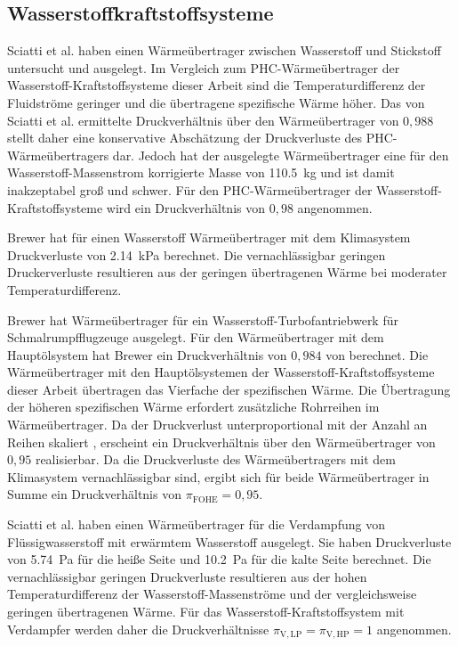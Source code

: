 \subsection{Wasserstoffkraftstoffsysteme}

Sciatti et al. \cite{Sciatti.2025} haben einen Wärmeübertrager zwischen Wasserstoff und Stickstoff untersucht und ausgelegt. Im Vergleich zum PHC-Wärmeübertrager der Wasserstoff-Kraftstoffsysteme dieser Arbeit sind die Temperaturdifferenz der Fluidströme geringer und die übertragene spezifische Wärme höher. Das von Sciatti et al. ermittelte Druckverhältnis über den Wärmeübertrager von $0,988$ stellt daher eine konservative Abschätzung der Druckverluste des PHC-Wärmeübertragers dar. Jedoch hat der ausgelegte Wärmeübertrager eine für den Wasserstoff-Massenstrom korrigierte Masse von \SI{110.5}{\kg} und ist damit inakzeptabel groß und schwer. Für den PHC-Wärmeübertrager der Wasserstoff-Kraftstoffsysteme wird ein Druckverhältnis von $0,98$ angenommen.

Brewer \cite{Brewer.1991} hat für einen Wasserstoff Wärmeübertrager mit dem Klimasystem Druckverluste von \SI{2.14}{\kilo\Pa} berechnet. Die vernachlässigbar geringen Druckerverluste resultieren aus der geringen übertragenen Wärme bei moderater Temperaturdifferenz.

Brewer \cite{Brewer.1991} hat Wärmeübertrager für ein Wasserstoff-Turbofantriebwerk für Schmalrumpfflugzeuge ausgelegt. Für den Wärmeübertrager mit dem Hauptölsystem hat Brewer ein Druckverhältnis von $0,984$ von berechnet. Die Wärmeübertrager mit den Hauptölsystemen der Wasserstoff-Kraftstoffsysteme dieser Arbeit übertragen das Vierfache der spezifischen Wärme. Die Übertragung der höheren spezifischen Wärme erfordert zusätzliche Rohrreihen im Wärmeübertrager. Da der Druckverlust unterproportional mit der Anzahl an Reihen skaliert \cite{.2013b}, erscheint ein Druckverhältnis über den Wärmeübertrager von $0,95$ realisierbar. Da die Druckverluste des Wärmeübertragers mit dem Klimasystem vernachlässigbar sind, ergibt sich für beide Wärmeübertrager in Summe ein Druckverhältnis von $\pi_{\mathrm{FOHE}}=0,95$.

Sciatti et al. \cite{Sciatti.2025} haben einen Wärmeübertrager für die Verdampfung von Flüssigwasserstoff mit erwärmtem Wasserstoff ausgelegt. Sie haben Druckverluste von \SI{5.74}{\Pa} für die heiße Seite und \SI{10.2}{\Pa} für die kalte Seite berechnet. Die vernachlässigbar geringen Druckverluste resultieren aus der hohen Temperaturdifferenz der Wasserstoff-Massenströme und der vergleichsweise geringen übertragenen Wärme. Für das Wasserstoff-Kraftstoffsystem mit Verdampfer werden daher die Druckverhältnisse $\pi_{\mathrm{V,LP}}=\pi_{\mathrm{V,HP}}=1$ angenommen.

